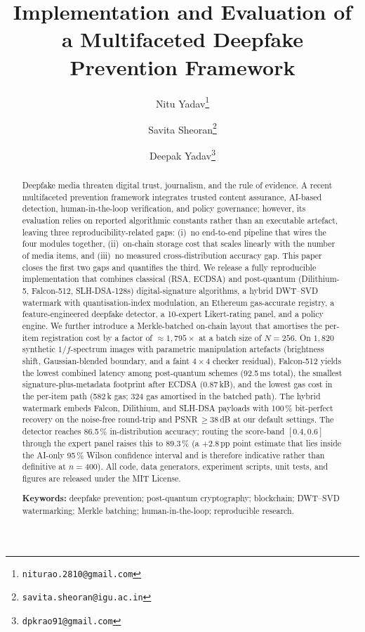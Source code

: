 \documentclass[11pt,a4paper]{article}
\title{\bfseries Implementation and Evaluation of a
Multifaceted Deepfake Prevention Framework}
\author[1]{Nitu Yadav\thanks{\texttt{niturao.2810@gmail.com}}}
\author[1]{Savita Sheoran\thanks{\texttt{savita.sheoran@igu.ac.in}}}
\author[1]{Deepak Yadav\thanks{\texttt{dpkrao91@gmail.com}}}
\affil[1]{Department of Computer Science \& Engineering, Indira Gandhi University, Meerpur, Rewari}
\theoremstyle{definition}
\theoremstyle{plain}
\theoremstyle{remark}
\begin{document}
\maketitle

\begin{abstract}\noindent
Deepfake media threaten digital trust, journalism, and the rule of
evidence. A recent multifaceted prevention framework integrates
trusted content assurance, AI-based detection, human-in-the-loop
verification, and policy governance; however, its evaluation relies
on reported algorithmic constants rather than an executable
artefact, leaving three reproducibility-related gaps: (i)~no
end-to-end pipeline that wires the four modules together,
(ii)~on-chain storage cost that scales linearly with the number of
media items, and (iii)~no measured cross-distribution accuracy
gap. This paper closes the first two gaps and quantifies the
third. We release a fully reproducible implementation that
combines classical (RSA, ECDSA) and post-quantum (Dilithium-5,
Falcon-512, SLH-DSA-128s) digital-signature algorithms, a hybrid
DWT--SVD watermark with quantisation-index modulation, an
Ethereum gas-accurate registry, a feature-engineered deepfake
detector, a 10-expert Likert-rating panel, and a policy engine.
We further introduce a Merkle-batched on-chain layout that
amortises the per-item registration cost by a factor of
$\approx 1{,}795\times$ at a batch size of $N{=}256$. On
$1{,}820$ synthetic $1/f$-spectrum images with parametric
manipulation artefacts (brightness shift, Gaussian-blended
boundary, and a faint $4\!\times\!4$ checker residual),
Falcon-512 yields the lowest combined latency among post-quantum
schemes (92.5\,ms total), the smallest signature-plus-metadata
footprint after ECDSA (0.87\,kB), and the lowest gas cost in the
per-item path (582\,k gas; 324 gas amortised in the batched
path). The hybrid watermark embeds Falcon, Dilithium, and SLH-DSA
payloads with 100\,\% bit-perfect recovery on the noise-free
round-trip and PSNR\,$\geq\!38$\,dB at our default settings. The
detector reaches 86.5\,\% in-distribution accuracy; routing the
score-band $[0.4, 0.6]$ through the expert panel raises this to
89.3\,\% (a $+2.8$\,pp point estimate that lies inside the
AI-only 95\,\% Wilson confidence interval and is therefore
indicative rather than definitive at $n{=}400$). All code, data
generators, experiment scripts, unit tests, and figures are
released under the MIT License.

\textbf{Keywords:} deepfake prevention; post-quantum cryptography;
blockchain; DWT--SVD watermarking; Merkle batching;
human-in-the-loop; reproducible research.
\end{abstract}
\end{document}
